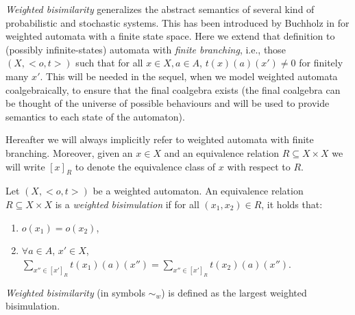 \documentclass[3p]{elsarticle}
\newcommand{\setproduct}{\times} %
\begin{document}
\emph{Weighted bisimilarity} generalizes the abstract semantics of
several kind of probabilistic and stochastic systems. This has been
introduced by Buchholz in \cite{german} for weighted automata with a
finite state space. Here we extend that definition to (possibly
infinite-states) automata with \emph{finite branching}, i.e., those
$(X, <o,t>)$ such that for all $ x\in X, a\in A$, $t(x)(a)(x')\neq
0$ for finitely many $x'$. This will be needed in the sequel, when we model weighted automata coalgebraically, to ensure
that the final coalgebra exists (the final coalgebra can be thought of the universe of possible behaviours and will be used to provide semantics to each state of the automaton).

Hereafter we will always implicitly refer to weighted automata with
finite branching. Moreover, given an $x\in X$ and an equivalence
relation $R\subseteq X\setproduct X$ we will write $[x]_R$ to denote
the equivalence class of $x$ with respect to $R$.

\begin{definition}\label{def:bis}
Let $(X, <o,t>)$ be a weighted automaton. An equivalence relation
$R\subseteq X \setproduct X$ is a \emph{weighted bisimulation} if
for all $(x_1,x_2)\in R$, it holds that:
\begin{enumerate}
\item $o(x_1)=o(x_2)$,
\item $\forall a\in A$, $x'\in X$, $\sum_{x''
\in [x']_R}t(x_1)(a)(x'') = \sum_{x'' \in [x']_R}t(x_2)(a)(x'')$.
\end{enumerate}
\emph{Weighted bisimilarity} (in symbols $\sim_w$) is defined as the
largest weighted bisimulation.
\end{definition}

%
%
\end{document}
